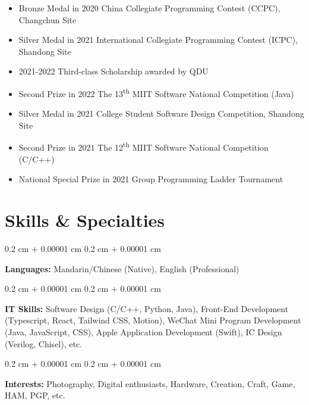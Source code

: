 \documentclass[10pt, letterpaper]{article}
\newenvironment{highlights}{
    \begin{itemize}[
        topsep=0.10 cm,
        parsep=0.10 cm,
        partopsep=0pt,
        itemsep=0pt,
        leftmargin=0.4 cm + 10pt
    ]
}{
    \end{itemize}
} %
\newenvironment{onecolentry}{
    \begin{adjustwidth}{
        0.2 cm + 0.00001 cm
    }{
        0.2 cm + 0.00001 cm
    }
}{
    \end{adjustwidth}
} %
\begin{document}
        
        \begin{highlights}
        \item Bronze Medal in 2020 China Collegiate Programming Contest (CCPC), Changchun Site
        \item Silver Medal in 2021 International Collegiate Programming Contest (ICPC), Shandong Site
        \item 2021-2022 Third-class Scholarship awarded by QDU
        \item Second Prize in 2022 The 13\textsuperscript{th} MIIT Software National Competition (Java)
        \item Silver Medal in 2021 College Student Software Design Competition, Shandong Site
        \item Second Prize in 2021 The 12\textsuperscript{th} MIIT Software National Competition (C/C++)
        \item National Special Prize in 2021 Group Programming Ladder Tournament
        \end{highlights}

        
    \section{Skills \& Specialties}



        
        \begin{onecolentry}
            \textbf{Languages:} Mandarin/Chinese (Native), English (Professional)
        \end{onecolentry}

        \vspace{0.2 cm}

        \begin{onecolentry}
            \textbf{IT Skills:} Software Design (C/C++, Python, Java), Front-End Development (Typescript, React, Tailwind CSS, Motion), WeChat Mini Program Development (Java, JavaScript, CSS), Apple Application Development (Swift), IC Design (Verilog, Chisel), etc.
        \end{onecolentry}
            
        \vspace{0.2 cm}

        \begin{onecolentry}
            \textbf{Interests: }Photography, Digital enthusiasts, Hardware, Creation, Craft, Game, HAM, PGP, etc.
        \end{onecolentry}


    
\end{document}
